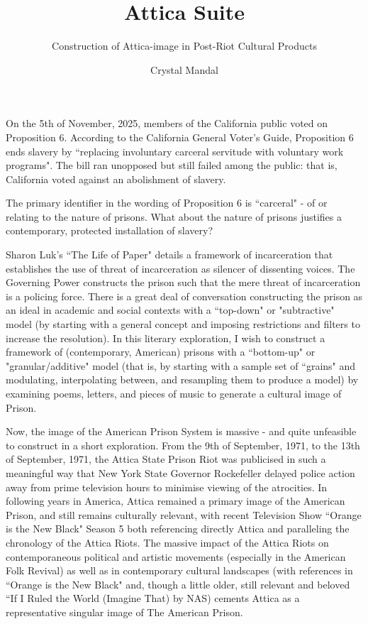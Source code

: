 \documentclass[14pt, letterpaper]{report}
\title{ \vspace*{-72pt} Attica Suite}
\subtitle{Construction of Attica-image in Post-Riot Cultural Products}
\author{Crystal Mandal}
\date{}
\begin{document}
\maketitle


	On the 5th of November, 2025, members of the California 
	public voted on Proposition 6. According to the California 
	General Voter's Guide, Proposition 6 ends slavery by 
	``replacing involuntary carceral servitude  with voluntary work 
	programs". The bill ran unopposed but still failed among the 
	public: that is, California voted against an abolishment of 
        slavery.
	
	The primary identifier in the wording of Proposition 
	6 is ``carceral" - of or relating to the nature of prisons. 
	What about the nature of prisons justifies a contemporary,
	protected installation of slavery?
	
	Sharon Luk's ``The Life of Paper" details a framework of 
	incarceration that establishes the use of threat of incarceration 
	as silencer of dissenting voices. The Governing Power constructs 
	the prison such that the mere threat of incarceration is a 
	policing force. There is a great deal of conversation constructing 
	the prison as an ideal in academic and social contexts with a 
	``top-down" or "subtractive" model (by starting with a general 
	concept and imposing restrictions and filters to increase the 
	resolution). In this literary exploration, I wish to construct a 
	framework of (contemporary, American) prisons with a ``bottom-up" 
	or "granular/additive" model (that is, by starting with a sample 
	set of ``grains" and modulating, interpolating between, and 
	resampling them to produce a model) by examining poems, letters, 
	and pieces of music to generate a cultural image of Prison.
	
	Now, the image of the American Prison System is massive - 
	and quite unfeasible to construct in a short exploration. From 
	the 9th of September, 1971, to the 13th of September, 1971, the 
	Attica State Prison Riot was publicised in such a meaningful way 
	that New York State Governor Rockefeller delayed police action away 
	from prime television hours to minimise viewing of the atrocities. 
	In following years in America, Attica remained a primary image of 
	the American Prison, and still remains culturally relevant, with 
	recent Television Show ``Orange is the New Black" Season 5 both 
	referencing directly Attica and paralleling the chronology of the 
	Attica Riots. The massive impact of the Attica Riots on contemporaneous 
	political and artistic movements (especially in the American Folk 
	Revival) as well as in contemporary cultural landscapes (with references 
	in ``Orange is the New Black" and, though a little older, still 
	relevant and beloved ``If I Ruled the World (Imagine That) by NAS) 
	cements Attica as a representative singular image of The American 
	Prison. 
	
\end{document}

